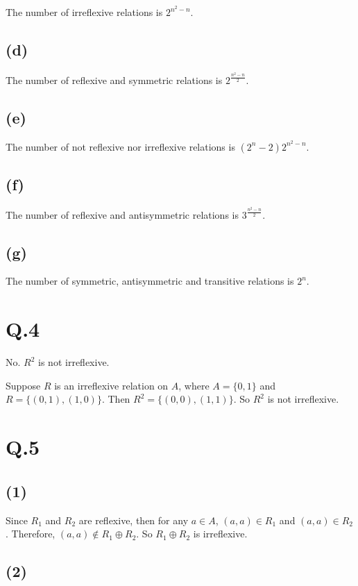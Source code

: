 \documentclass[a4paper,12pt]{article}
\begin{document}
The number of irreflexive relations is $2^{n^2-n}$.

\subsection*{(d)}

The number of reflexive and symmetric relations is $2^{\frac{n^2-n}{2}}$.

\subsection*{(e)}

The number of not reflexive nor irreflexive relations is $(2^n - 2)2^{n^2-n}$.

\subsection*{(f)}

The number of reflexive and antisymmetric relations is $3^{\frac{n^2-n}{2}}$.

\subsection*{(g)}

The number of symmetric, antisymmetric and transitive relations is $2^n$.
\section*{Q.4}

No. 
$R^2$ is not irreflexive.

Suppose $R$ is an irreflexive relation on $A$, where $A = \{0, 1\}$ and $R = \{(0, 1), (1, 0)\}$.
Then $R^2 = \{(0, 0), (1, 1)\}$. So $R^2$ is not irreflexive.

\section*{Q.5}

\subsection*{(1)}

Since $R_1$ and $R_2$ are reflexive, then for any $a \in A$, $(a, a) \in R_1$ and $(a, a) \in R_2$.
Therefore, $(a, a) \not\in R_1 \oplus R_2$. So $R_1 \oplus R_2$ is irreflexive.

\subsection*{(2)}
\end{document}
